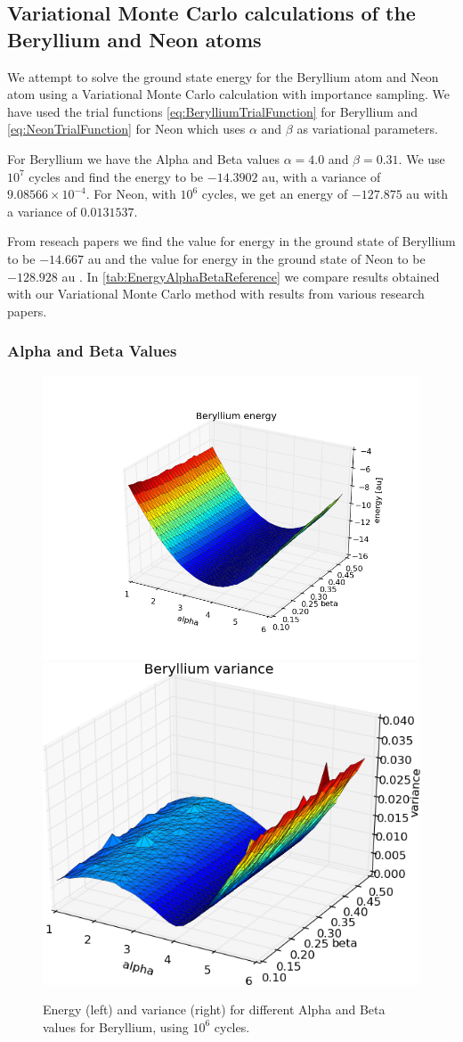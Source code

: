 \subsection{Variational Monte Carlo calculations of the Beryllium and Neon atoms}

	We attempt to solve the ground state energy for the Beryllium atom and Neon atom using a Variational Monte Carlo calculation with importance sampling. We have used the trial functions \eqref{eq:BerylliumTrialFunction} for Beryllium and \eqref{eq:NeonTrialFunction} for Neon which uses $\alpha$ and $\beta$ as variational parameters.

	For Beryllium we have the Alpha and Beta values $\alpha=4.0$ and $\beta=0.31$. We use $10^{7}$ cycles and find the energy to be $-14.3902$ au, with a variance of $9.08566 \times 10^{-4}$.
	For Neon, with $10^{6}$ cycles, we get an energy of $-127.875$ au with a variance of $0.0131537$.

	From reseach papers we find the value for energy in the ground state
	of Beryllium to be $-14.667$ au \parencite{Koput_2011_PCCP}  and the value
	for energy in the ground state of Neon to be \(-128.928\) au \parencite{Binkley_1975}.
	In \cref{tab:EnergyAlphaBetaReference} we compare results
	obtained with our Variational Monte Carlo method with results from
	various research papers.

	\subsubsection{Alpha and Beta Values}

		\begin{figure}
			\centering \includegraphics[width=0.45\linewidth]{../figures/Beryllium_alpha_beta_energy}
			\centering \includegraphics[width=0.45\linewidth]{../figures/Beryllium_alpha_beta_variance}
			\protect\caption{Energy (left) and variance (right) for different Alpha and Beta values for Beryllium, using $10^{6}$ cycles.}
			\label{fig:alpha_beta_comparison_beryllium}
		\end{figure}

